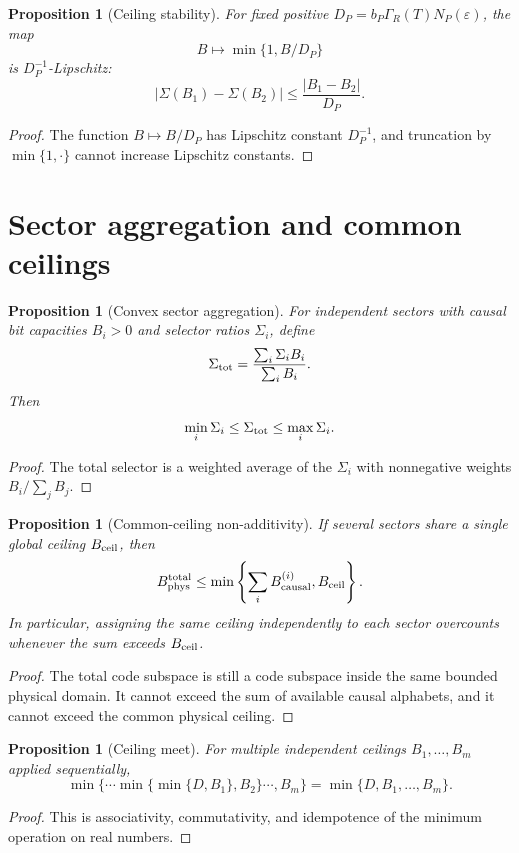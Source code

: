 \documentclass[11pt,a4paper]{article}
\newtheorem{proposition}[theorem]{Proposition}
\begin{document}
\begin{proposition}[Ceiling stability]
For fixed positive $D_P=b_P\Gamma_R(T)N_P(\varepsilon)$, the map
\[
B\mapsto \min\{1,B/D_P\}
\]
is $D_P^{-1}$-Lipschitz:
\[
|\Sigma(B_1)-\Sigma(B_2)|\le\frac{|B_1-B_2|}{D_P}.
\]
\end{proposition}
\begin{proof}
The function $B\mapsto B/D_P$ has Lipschitz constant $D_P^{-1}$, and truncation by $\min\{1,\cdot\}$ cannot increase Lipschitz constants.\end{proof}

\section{Sector aggregation and common ceilings}

\begin{proposition}[Convex sector aggregation]
For independent sectors with causal bit capacities $B_i>0$ and selector ratios $\Sigma_i$, define
\[
\Sigma_{\rm tot}=\frac{\sum_i\Sigma_iB_i}{\sum_iB_i}.
\]
Then
\[
\min_i\Sigma_i\le\Sigma_{\rm tot}\le\max_i\Sigma_i.
\]
\end{proposition}
\begin{proof}
The total selector is a weighted average of the $\Sigma_i$ with nonnegative weights $B_i/\sum_jB_j$.\end{proof}

\begin{proposition}[Common-ceiling non-additivity]
If several sectors share a single global ceiling $B_{\rm ceil}$, then
\[
B_{\rm phys}^{\rm total}\le\min\left\{\sum_iB_{\rm causal}^{(i)},B_{\rm ceil}\right\}.
\]
In particular, assigning the same ceiling independently to each sector overcounts whenever the sum exceeds $B_{\rm ceil}$.
\end{proposition}
\begin{proof}
The total code subspace is still a code subspace inside the same bounded physical domain.  It cannot exceed the sum of available causal alphabets, and it cannot exceed the common physical ceiling.\end{proof}

\begin{proposition}[Ceiling meet]
For multiple independent ceilings $B_1,\dots,B_m$ applied sequentially,
\[
\min\{\cdots\min\{\min\{D,B_1\},B_2\}\cdots,B_m\}
=\min\{D,B_1,\dots,B_m\}.
\]
\end{proposition}
\begin{proof}
This is associativity, commutativity, and idempotence of the minimum operation on real numbers.\end{proof}
\end{document}
